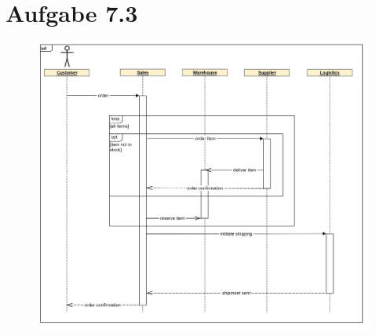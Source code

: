 \documentclass{scrartcl}
\begin{document}
	\pagebreak
	
	\section*{Aufgabe 7.3}
		\begin{figure}[h!]
			\includegraphics[scale=0.2]{aufgabe_7_3.jpg}
		\end{figure}
	
	
\end{document}
